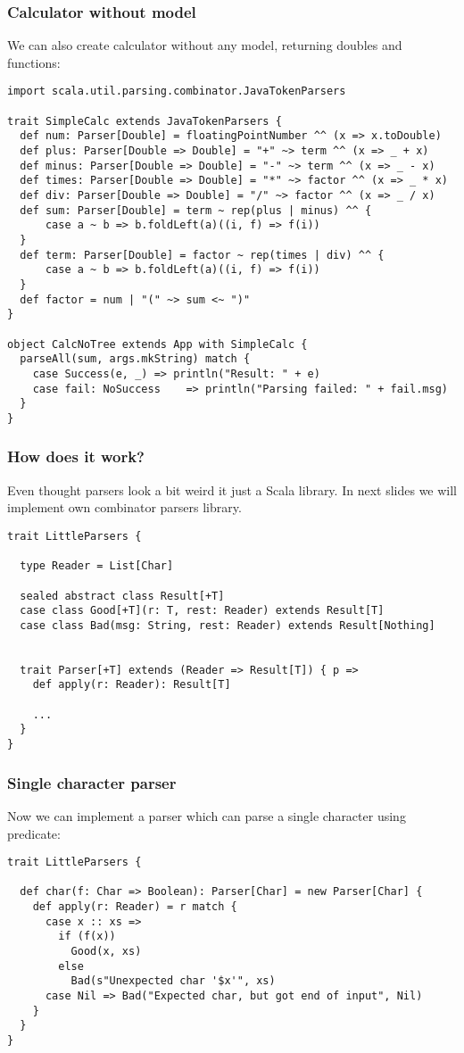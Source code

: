 \documentclass[t]{beamer}
\begin{document}
\begin{frame}[fragile]
\frametitle{Calculator without model}

We can also create calculator without any model, returning doubles and functions:

\begin{lstlisting}
import scala.util.parsing.combinator.JavaTokenParsers

trait SimpleCalc extends JavaTokenParsers {
  def num: Parser[Double] = floatingPointNumber ^^ (x => x.toDouble)
  def plus: Parser[Double => Double] = "+" ~> term ^^ (x => _ + x)
  def minus: Parser[Double => Double] = "-" ~> term ^^ (x => _ - x)
  def times: Parser[Double => Double] = "*" ~> factor ^^ (x => _ * x)
  def div: Parser[Double => Double] = "/" ~> factor ^^ (x => _ / x)
  def sum: Parser[Double] = term ~ rep(plus | minus) ^^ {
      case a ~ b => b.foldLeft(a)((i, f) => f(i))
  }
  def term: Parser[Double] = factor ~ rep(times | div) ^^ {
      case a ~ b => b.foldLeft(a)((i, f) => f(i))
  }
  def factor = num | "(" ~> sum <~ ")"
}

object CalcNoTree extends App with SimpleCalc {
  parseAll(sum, args.mkString) match {
    case Success(e, _) => println("Result: " + e)
    case fail: NoSuccess    => println("Parsing failed: " + fail.msg)
  }
}
\end{lstlisting}
\end{frame}

\begin{frame}[fragile]
\frametitle{How does it work?}
Even thought parsers look a bit weird it just a Scala library.  In next slides we will
implement own combinator parsers library.
\begin{lstlisting}
trait LittleParsers {

  type Reader = List[Char]

  sealed abstract class Result[+T]
  case class Good[+T](r: T, rest: Reader) extends Result[T]
  case class Bad(msg: String, rest: Reader) extends Result[Nothing]


  trait Parser[+T] extends (Reader => Result[T]) { p =>
    def apply(r: Reader): Result[T]

    ...
  }
}
\end{lstlisting}
\end{frame}

\begin{frame}[fragile]
\frametitle{Single character parser}
Now we can implement a parser which can parse a single character using predicate:
\begin{lstlisting}
trait LittleParsers {

  def char(f: Char => Boolean): Parser[Char] = new Parser[Char] {
    def apply(r: Reader) = r match {
      case x :: xs =>
        if (f(x))
          Good(x, xs)
        else
          Bad(s"Unexpected char '$x'", xs)
      case Nil => Bad("Expected char, but got end of input", Nil)
    }
  }
}
\end{lstlisting}
\end{frame}
\end{document}
